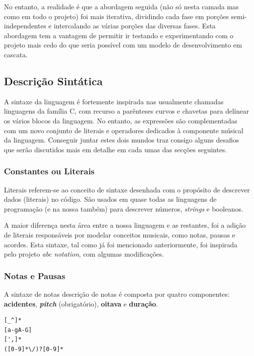 No entanto, a realidade é que a abordagem seguida (não só nesta camada mas como em todo o projeto) foi mais iterativa, dividindo cada fase em porções semi-independentes e intercalando as várias porções das diversas fases. Esta abordagem tem a vantagem de permitir ir testando e experimentando com o projeto mais cedo do que seria possível com um modelo de desenvolvimento em cascata.

\subsection{Descrição Sintática}
A sintaxe da linguagem é fortemente inspirada nas usualmente chamadas linguagens da família C, com recurso a parênteses curvos e chavetas para delínear os vários blocos da linguagem. No entanto, as expressões são complementadas com um novo conjunto de literais e operadores dedicados à componente músical da linguagem. Conseguir juntar estes dois mundos traz consigo alguns desafios que serão discutidos mais em detalhe em cada umas das secções seguintes.

\subsubsection{\textbf{Constantes ou Literais}}
Literais referem-se ao conceito de sintaxe desenhada com o propósito de descrever dados (literais) no código. São usados em quase todas as linguagens de programação (e na nossa também) para descrever números, \textit{strings} e booleanos.

A maior diferença nesta área entre a nossa linguagem e as restantes, foi a adição de literais responsáveis por modelar conceitos musicais, como notas, pausas e acordes. Esta sintaxe, tal como já foi mencionado anteriormente, foi inspirada pelo projeto \textit{abc notation}, com algumas modificações.

\subsubsection{\textbf{Notas e Pausas}}
A sintaxe de notas descrição de notas é composta por quatro componentes: \textbf{acidentes}, \textbf{\textit{pitch}} (obrigatório), \textbf{oitava} e \textbf{duração}.

\begin{lstlisting}[caption=Expressão Regular que identifica uma nota (quebras de linha adicionadas apenas para claridade de leitura)]
[_^]*
[a-gA-G]
[',]*
([0-9]*\/)?[0-9]*
\end{lstlisting}

